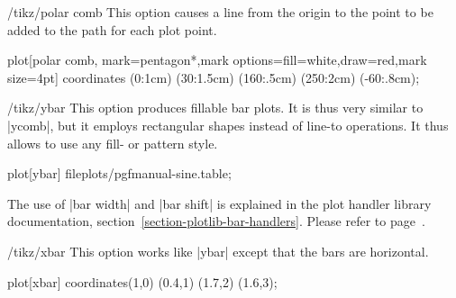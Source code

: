 \begin{key}{/tikz/polar comb}
  This option causes a line from the origin to the point to be added
  to the path for each plot point.

\begin{codeexample}[]
\tikz \draw plot[polar comb,
     mark=pentagon*,mark options={fill=white,draw=red},mark size=4pt]
   coordinates {(0:1cm) (30:1.5cm) (160:.5cm) (250:2cm) (-60:.8cm)};
\end{codeexample}
\end{key}

\begin{key}{/tikz/ybar}
  This option produces fillable bar plots. It is thus very similar to |ycomb|, but it employs rectangular shapes instead of line-to operations. It thus allows to use any fill- or pattern style.

\begin{codeexample}[]
\tikz\draw[draw=blue,fill=blue!60!black] plot[ybar] file{plots/pgfmanual-sine.table};
\end{codeexample}

\begin{codeexample}[]
\end{codeexample}
	The use of |bar width| and |bar shift| is explained in the plot handler library documentation, section~\ref{section-plotlib-bar-handlers}. Please refer to page~\pageref{key-bar-width}.
\end{key}

\begin{key}{/tikz/xbar}
  This option works like |ybar| except that the bars are horizontal.

\begin{codeexample}[]
\tikz \draw[pattern=north west lines] plot[xbar]
   coordinates{(1,0) (0.4,1) (1.7,2) (1.6,3)};
\end{codeexample}
\end{key}

